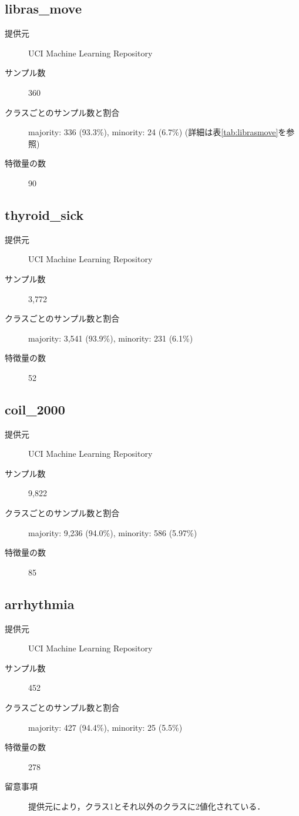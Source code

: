 \subsection{libras\_move}
\begin{description}
    \item[提供元] UCI Machine Learning Repository
    \item[サンプル数] 360
    \item[クラスごとのサンプル数と割合] majority: 336 (93.3\%), minority: 24 (6.7\%) (詳細は表\ref{tab:librasmove}を参照)

    \item[特徴量の数] 90
\end{description}

\subsection{thyroid\_sick}
\begin{description}
    \item[提供元] UCI Machine Learning Repository
    \item[サンプル数] 3,772
    \item[クラスごとのサンプル数と割合] majority: 3,541 (93.9\%), minority: 231 (6.1\%) 

    \item[特徴量の数] 52
\end{description}

\subsection{coil\_2000}
\begin{description}
    \item[提供元] UCI Machine Learning Repository
    \item[サンプル数] 9,822
    \item[クラスごとのサンプル数と割合] majority: 9,236 (94.0\%), minority: 586 (5.97\%) 

    \item[特徴量の数] 85
\end{description}

\subsection{arrhythmia}
\begin{description}
    \item[提供元] UCI Machine Learning Repository
    \item[サンプル数] 452
    \item[クラスごとのサンプル数と割合] majority: 427 (94.4\%), minority: 25 (5.5\%)

    \item[特徴量の数] 278
        
    \item[留意事項] 提供元により，クラス1とそれ以外のクラスに2値化されている．
\end{description}


